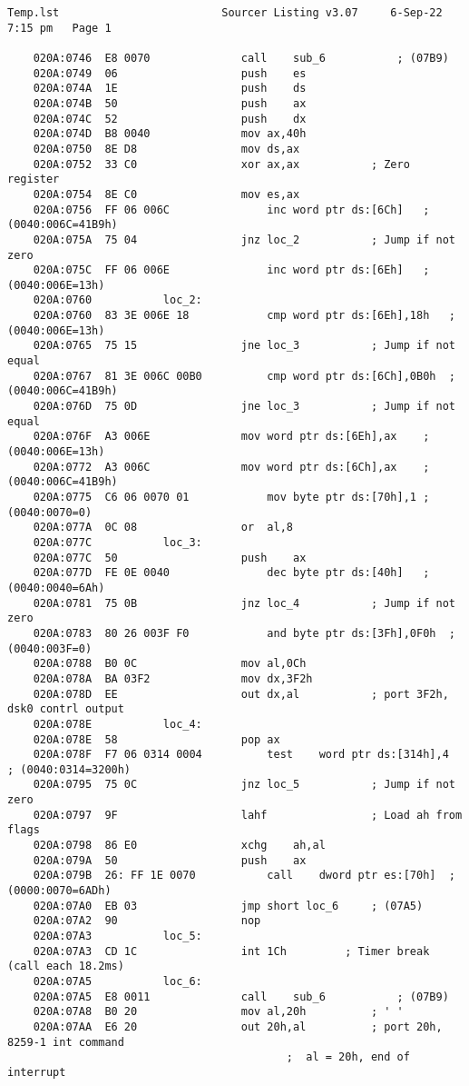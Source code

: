 \documentclass[a4paper,12pt]{bmstu}
\begin{document}
\begin{lstlisting}[style={asm},label={lst:INT8H}]
    Temp.lst						 Sourcer Listing v3.07     6-Sep-22   7:15 pm   Page 1

    020A:0746  E8 0070				call	sub_6			; (07B9)
    020A:0749  06					push	es
    020A:074A  1E					push	ds
    020A:074B  50					push	ax
    020A:074C  52					push	dx
    020A:074D  B8 0040				mov	ax,40h
    020A:0750  8E D8				mov	ds,ax
    020A:0752  33 C0				xor	ax,ax			; Zero register
    020A:0754  8E C0				mov	es,ax
    020A:0756  FF 06 006C				inc	word ptr ds:[6Ch]	; (0040:006C=41B9h)
    020A:075A  75 04				jnz	loc_2			; Jump if not zero
    020A:075C  FF 06 006E				inc	word ptr ds:[6Eh]	; (0040:006E=13h)
    020A:0760			loc_2:
    020A:0760  83 3E 006E 18			cmp	word ptr ds:[6Eh],18h	; (0040:006E=13h)
    020A:0765  75 15				jne	loc_3			; Jump if not equal
    020A:0767  81 3E 006C 00B0			cmp	word ptr ds:[6Ch],0B0h	; (0040:006C=41B9h)
    020A:076D  75 0D				jne	loc_3			; Jump if not equal
    020A:076F  A3 006E				mov	word ptr ds:[6Eh],ax	; (0040:006E=13h)
    020A:0772  A3 006C				mov	word ptr ds:[6Ch],ax	; (0040:006C=41B9h)
    020A:0775  C6 06 0070 01			mov	byte ptr ds:[70h],1	; (0040:0070=0)
    020A:077A  0C 08				or	al,8
    020A:077C			loc_3:
    020A:077C  50					push	ax
    020A:077D  FE 0E 0040				dec	byte ptr ds:[40h]	; (0040:0040=6Ah)
    020A:0781  75 0B				jnz	loc_4			; Jump if not zero
    020A:0783  80 26 003F F0			and	byte ptr ds:[3Fh],0F0h	; (0040:003F=0)
    020A:0788  B0 0C				mov	al,0Ch
    020A:078A  BA 03F2				mov	dx,3F2h
    020A:078D  EE					out	dx,al			; port 3F2h, dsk0 contrl output
    020A:078E			loc_4:
    020A:078E  58					pop	ax
    020A:078F  F7 06 0314 0004			test	word ptr ds:[314h],4	; (0040:0314=3200h)
    020A:0795  75 0C				jnz	loc_5			; Jump if not zero
    020A:0797  9F					lahf				; Load ah from flags
    020A:0798  86 E0				xchg	ah,al
    020A:079A  50					push	ax
    020A:079B  26: FF 1E 0070			call	dword ptr es:[70h]	; (0000:0070=6ADh)
    020A:07A0  EB 03				jmp	short loc_6		; (07A5)
    020A:07A2  90					nop
    020A:07A3			loc_5:
    020A:07A3  CD 1C				int	1Ch			; Timer break (call each 18.2ms)
    020A:07A5			loc_6:
    020A:07A5  E8 0011				call	sub_6			; (07B9)
    020A:07A8  B0 20				mov	al,20h			; ' '
    020A:07AA  E6 20				out	20h,al			; port 20h, 8259-1 int command
                                           ;  al = 20h, end of interrupt

\end{lstlisting}
\clearpage
\end{document}

